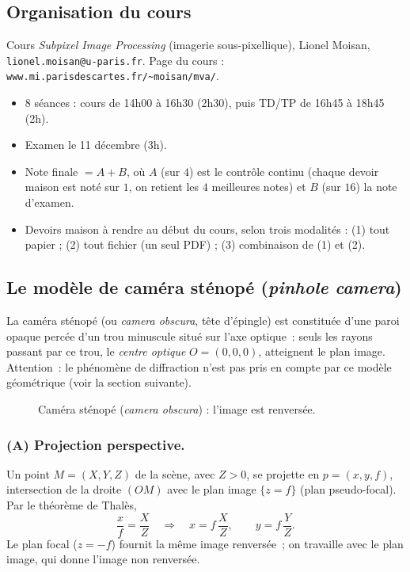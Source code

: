
\subsection*{Organisation du cours}
Cours \emph{Subpixel Image Processing} (imagerie sous-pixellique), Lionel Moisan, \nolinkurl{lionel.moisan@u-paris.fr}. Page du cours : \nolinkurl{www.mi.parisdescartes.fr/~moisan/mva/}.
\begin{itemize}
  \item 8 séances : cours de 14h00 à 16h30 (2h30), puis TD/TP de 16h45 à 18h45 (2h).
  \item Examen le 11 décembre (3h).
  \item Note finale $=A+B$, où $A$ (sur $4$) est le contrôle continu (chaque devoir maison est noté sur $1$, on retient les $4$ meilleures notes) et $B$ (sur $16$) la note d'examen.
  \item Devoirs maison à rendre au début du cours, selon trois modalités : (1) tout papier ; (2) tout fichier (un seul PDF) ; (3) combinaison de (1) et (2).
\end{itemize}

\subsection{Le modèle de caméra sténopé (\emph{pinhole camera})}
La caméra sténopé (ou \emph{camera obscura}, \og tête d'épingle\fg{}) est constituée d'une paroi opaque percée d'un trou minuscule situé sur l'axe optique~: seuls les rayons passant par ce trou, le \emph{centre optique} $O=(0,0,0)$, atteignent le plan image. Attention~: le phénomène de diffraction n'est pas pris en compte par ce modèle géométrique (voir la section suivante).


\begin{figure}[!htb]\centering
  
  \caption{Caméra sténopé (\emph{camera obscura}) : l'image est renversée.}\label{fig:camera-obscura}
\end{figure}

\subsubsection{(A) Projection perspective.}
Un point $M=(X,Y,Z)$ de la scène, avec $Z>0$, se projette en $p=(x,y,f)$, intersection de la droite $(OM)$ avec le plan image $\{z=f\}$ (plan pseudo-focal). Par le théorème de Thalès,
\[
  \frac{x}{f}=\frac{X}{Z}\quad\Longrightarrow\quad x=f\,\frac{X}{Z},\qquad y=f\,\frac{Y}{Z}.
\]
Le plan focal ($z=-f$) fournit la même image renversée~; on travaille avec le plan image, qui donne l'image non renversée.

